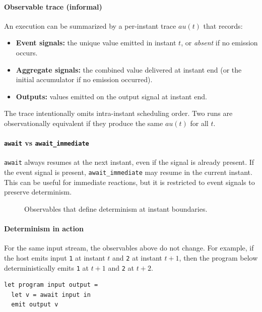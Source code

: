 \paragraph{Observable trace (informal)}
An execution can be summarized by a per-instant trace $au(t)$ that records:
\begin{itemize}
\item \textbf{Event signals:} the unique value emitted in instant $t$, or
  \emph{absent} if no emission occurs.
\item \textbf{Aggregate signals:} the combined value delivered at instant end
  (or the initial accumulator if no emission occurred).
\item \textbf{Outputs:} values emitted on the output signal at instant end.
\end{itemize}
The trace intentionally omits intra-instant scheduling order. Two runs are
observationally equivalent if they produce the same $au(t)$ for all $t$.

\paragraph{\texttt{await} vs \texttt{await\_immediate}}
\texttt{await} always resumes at the next instant, even if the signal is already
present. If the event signal is present, \texttt{await\_\allowbreak immediate}
may resume in the current instant. This can be useful for immediate reactions,
but it is restricted to event signals to preserve determinism.

\begin{figure}[h]
\centering
{}
\caption{Observables that define determinism at instant boundaries.}
\end{figure}

\paragraph{Determinism in action}
For the same input stream, the observables above do not change. For example,
if the host emits input \texttt{1} at instant $t$ and \texttt{2} at instant
$t{+}1$, then the program below deterministically emits \texttt{1} at $t{+}1$
and \texttt{2} at $t{+}2$.
\begin{lstlisting}[style=tempo]
let program input output =
  let v = await input in
  emit output v
\end{lstlisting}

